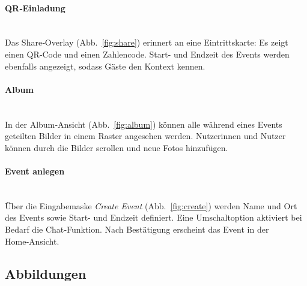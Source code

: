 \documentclass[11pt,a4paper]{article}
\begin{document}
\paragraph{QR‑Einladung}\mbox{}\\
Das Share‑Overlay (Abb.~\ref{fig:share}) erinnert an eine Eintrittskarte: Es zeigt einen QR‑Code und einen Zahlencode. Start- und Endzeit des Events werden ebenfalls angezeigt, sodass Gäste den Kontext kennen.

\paragraph{Album}\mbox{}\\
In der Album‑Ansicht (Abb.~\ref{fig:album}) können alle während eines Events geteilten Bilder in einem Raster angesehen werden. Nutzerinnen und Nutzer können durch die Bilder scrollen und neue Fotos hinzufügen.

\paragraph{Event anlegen}\mbox{}\\
Über die Eingabemaske \emph{Create Event} (Abb.~\ref{fig:create}) werden Name und Ort des Events sowie Start- und Endzeit definiert. Eine Umschaltoption aktiviert bei Bedarf die Chat‑Funktion. Nach Bestätigung erscheint das Event in der Home‑Ansicht.

\subsection*{Abbildungen}
\end{document}
